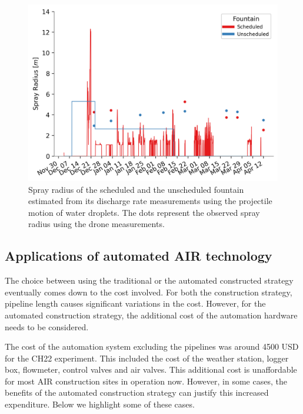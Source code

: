 \documentclass[tc, manuscript]{copernicus}
\begin{document}
\begin{figure}[t]
\includegraphics[width=12cm]{Figures/radf.png}

\caption{ Spray radius of the scheduled and the unscheduled fountain estimated from its discharge rate measurements using the
projectile motion of water droplets. The dots represent the observed spray radius using the drone measurements.
}

\label{fig:radf}
\end{figure}



\subsection{Applications of automated AIR technology}

The choice between using the traditional or the automated constructed strategy eventually comes down to the cost
involved. For both the construction strategy, pipeline length causes significant variations in the cost.
However, for the automated construction strategy, the additional cost of the automation hardware needs to be
considered.

The cost of the automation system excluding the pipelines was around 4500 USD for the CH22 experiment. This
included the cost of the weather station, logger box, flowmeter, control valves and air valves. This additional
cost is unaffordable for most AIR construction sites in operation now. However, in some cases, the benefits of
the automated construction strategy can justify this increased expenditure. Below we highlight some of these
cases.
\end{document}
